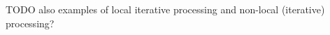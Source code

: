 \documentclass [12pt,a4paper]{report}
\begin{document}
TODO also examples of local iterative processing and non-local (iterative) processing?







\end{document}
